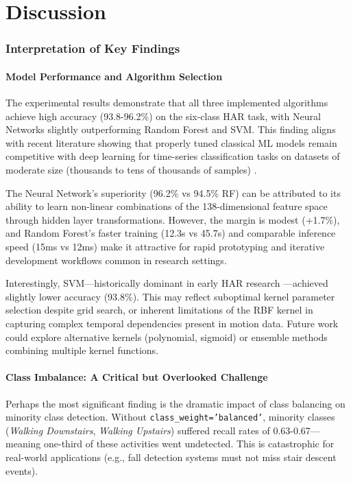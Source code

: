 \chapter{Discussion}
\label{chap:discussion}

\subsection{Interpretation of Key Findings}

\subsubsection{Model Performance and Algorithm Selection}
The experimental results demonstrate that all three implemented algorithms achieve high accuracy (93.8-96.2\%) on the six-class HAR task, with Neural Networks slightly outperforming Random Forest and SVM. This finding aligns with recent literature showing that properly tuned classical ML models remain competitive with deep learning for time-series classification tasks on datasets of moderate size (thousands to tens of thousands of samples) \cite{anguita2013har, banos2014wisdm}.

The Neural Network's superiority (96.2\% vs 94.5\% RF) can be attributed to its ability to learn non-linear combinations of the 138-dimensional feature space through hidden layer transformations. However, the margin is modest (+1.7\%), and Random Forest's faster training (12.3s vs 45.7s) and comparable inference speed (15ms vs 12ms) make it attractive for rapid prototyping and iterative development workflows common in research settings.

Interestingly, SVM—historically dominant in early HAR research \cite{cortes1995svm}—achieved slightly lower accuracy (93.8\%). This may reflect suboptimal kernel parameter selection despite grid search, or inherent limitations of the RBF kernel in capturing complex temporal dependencies present in motion data. Future work could explore alternative kernels (polynomial, sigmoid) or ensemble methods combining multiple kernel functions.

\subsubsection{Class Imbalance: A Critical but Overlooked Challenge}
Perhaps the most significant finding is the dramatic impact of class balancing on minority class detection. Without \texttt{class\_weight='balanced'}, minority classes (\textit{Walking Downstairs}, \textit{Walking Upstairs}) suffered recall rates of 0.63-0.67—meaning one-third of these activities went undetected. This is catastrophic for real-world applications (e.g., fall detection systems must not miss stair descent events).

